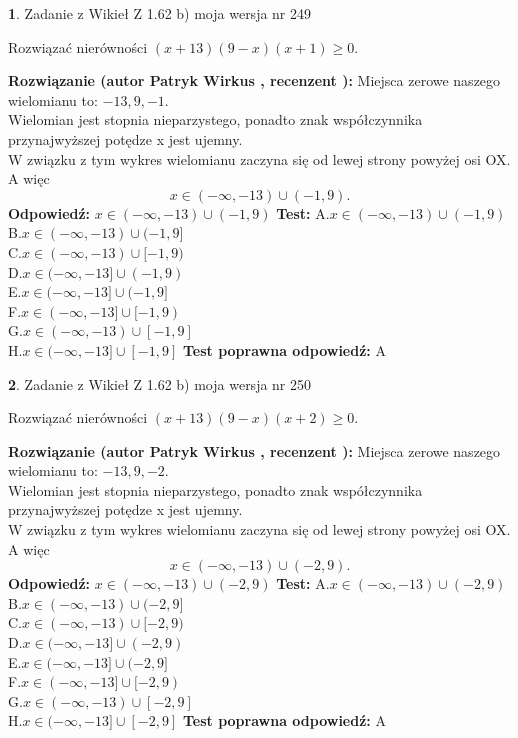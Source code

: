 \documentclass[12pt, a4paper]{article}
\theoremstyle{definition} %
\newtheorem{zad}{}
\newcommand{\zadStart}[1]{\begin{zad}#1\newline}
\newcommand{\zadStop}{\end{zad}}
\newcommand{\rozwStart}[2]{\noindent \textbf{Rozwiązanie (autor #1 , recenzent #2): }\newline}
\newcommand{\rozwStop}{\newline}
\newcommand{\odpStart}{\noindent \textbf{Odpowiedź:}\newline}
\newcommand{\odpStop}{\newline}
\newcommand{\testStart}{\noindent \textbf{Test:}\newline}
\newcommand{\testStop}{\newline}
\newcommand{\kluczStart}{\noindent \textbf{Test poprawna odpowiedź:}\newline}
\newcommand{\kluczStop}{\newline}
\begin{document}
\zadStart{Zadanie z Wikieł Z 1.62 b) moja wersja nr 249}

Rozwiązać nierówności $(x+13)(9-x)(x+1)\ge0$.
\zadStop
\rozwStart{Patryk Wirkus}{}
Miejsca zerowe naszego wielomianu to: $-13, 9, -1$.\\
Wielomian jest stopnia nieparzystego, ponadto znak współczynnika przy\linebreak najwyższej potędze x jest ujemny.\\ W związku z tym wykres wielomianu zaczyna się od lewej strony powyżej osi OX. A więc $$x \in (-\infty,-13) \cup (-1,9).$$
\rozwStop
\odpStart
$x \in (-\infty,-13) \cup (-1,9)$
\odpStop
\testStart
A.$x \in (-\infty,-13) \cup (-1,9)$\\
B.$x \in (-\infty,-13) \cup (-1,9]$\\
C.$x \in (-\infty,-13) \cup [-1,9)$\\
D.$x \in (-\infty,-13] \cup (-1,9)$\\
E.$x \in (-\infty,-13] \cup (-1,9]$\\
F.$x \in (-\infty,-13] \cup [-1,9)$\\
G.$x \in (-\infty,-13) \cup [-1,9]$\\
H.$x \in (-\infty,-13] \cup [-1,9]$
\testStop
\kluczStart
A
\kluczStop



\zadStart{Zadanie z Wikieł Z 1.62 b) moja wersja nr 250}

Rozwiązać nierówności $(x+13)(9-x)(x+2)\ge0$.
\zadStop
\rozwStart{Patryk Wirkus}{}
Miejsca zerowe naszego wielomianu to: $-13, 9, -2$.\\
Wielomian jest stopnia nieparzystego, ponadto znak współczynnika przy\linebreak najwyższej potędze x jest ujemny.\\ W związku z tym wykres wielomianu zaczyna się od lewej strony powyżej osi OX. A więc $$x \in (-\infty,-13) \cup (-2,9).$$
\rozwStop
\odpStart
$x \in (-\infty,-13) \cup (-2,9)$
\odpStop
\testStart
A.$x \in (-\infty,-13) \cup (-2,9)$\\
B.$x \in (-\infty,-13) \cup (-2,9]$\\
C.$x \in (-\infty,-13) \cup [-2,9)$\\
D.$x \in (-\infty,-13] \cup (-2,9)$\\
E.$x \in (-\infty,-13] \cup (-2,9]$\\
F.$x \in (-\infty,-13] \cup [-2,9)$\\
G.$x \in (-\infty,-13) \cup [-2,9]$\\
H.$x \in (-\infty,-13] \cup [-2,9]$
\testStop
\kluczStart
A
\kluczStop
\end{document}
